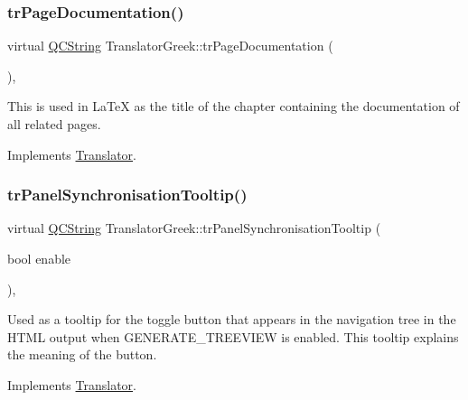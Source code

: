 \mbox{\label{class_translator_greek_af9b4ccfc75cdcc12ec46db89606459b4}} 
\subsubsection{\texorpdfstring{trPageDocumentation()}{trPageDocumentation()}}
{\footnotesize\ttfamily virtual \mbox{\hyperlink{class_q_c_string}{Q\+C\+String}} Translator\+Greek\+::tr\+Page\+Documentation (\begin{DoxyParamCaption}{ }\end{DoxyParamCaption})\hspace{0.3cm}{\ttfamily [inline]}, {\ttfamily [virtual]}}

This is used in La\+TeX as the title of the chapter containing the documentation of all related pages. 

Implements \mbox{\hyperlink{class_translator}{Translator}}.

\mbox{\label{class_translator_greek_adb0f9d5be27cefb6fb0cc3b593ec1ae7}} 
\subsubsection{\texorpdfstring{trPanelSynchronisationTooltip()}{trPanelSynchronisationTooltip()}}
{\footnotesize\ttfamily virtual \mbox{\hyperlink{class_q_c_string}{Q\+C\+String}} Translator\+Greek\+::tr\+Panel\+Synchronisation\+Tooltip (\begin{DoxyParamCaption}\item[{bool}]{enable }\end{DoxyParamCaption})\hspace{0.3cm}{\ttfamily [inline]}, {\ttfamily [virtual]}}

Used as a tooltip for the toggle button that appears in the navigation tree in the H\+T\+ML output when G\+E\+N\+E\+R\+A\+T\+E\+\_\+\+T\+R\+E\+E\+V\+I\+EW is enabled. This tooltip explains the meaning of the button. 

Implements \mbox{\hyperlink{class_translator}{Translator}}.

